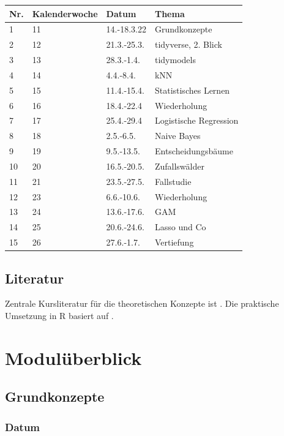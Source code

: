 \documentclass[
]{book}
\begin{document}
\begin{longtable}[]{@{}llll@{}}
\toprule
Nr. & Kalenderwoche & Datum & Thema \\
\midrule
\endhead
1 & 11 & 14.-18.3.22 & Grundkonzepte \\
2 & 12 & 21.3.-25.3. & tidyverse, 2. Blick \\
3 & 13 & 28.3.-1.4. & tidymodels \\
4 & 14 & 4.4.-8.4. & kNN \\
5 & 15 & 11.4.-15.4. & Statistisches Lernen \\
6 & 16 & 18.4.-22.4 & Wiederholung \\
7 & 17 & 25.4.-29.4 & Logistische Regression \\
8 & 18 & 2.5.-6.5. & Naive Bayes \\
9 & 19 & 9.5.-13.5. & Entscheidungsbäume \\
10 & 20 & 16.5.-20.5. & Zufallswälder \\
11 & 21 & 23.5.-27.5. & Fallstudie \\
12 & 23 & 6.6.-10.6. & Wiederholung \\
13 & 24 & 13.6.-17.6. & GAM \\
14 & 25 & 20.6.-24.6. & Lasso und Co \\
15 & 26 & 27.6.-1.7. & Vertiefung \\
\bottomrule
\end{longtable}

\hypertarget{literatur}{%
\section{Literatur}\label{literatur}}

Zentrale Kursliteratur für die theoretischen Konzepte ist \citep{rhys_machine_2020}.
Die praktische Umsetzung in R basiert auf \citep{silge_tidy_2022}.

\hypertarget{moduluxfcberblick}{%
\chapter{Modulüberblick}\label{moduluxfcberblick}}

\hypertarget{grundkonzepte}{%
\section{Grundkonzepte}\label{grundkonzepte}}

\hypertarget{datum}{%
\subsection{Datum}\label{datum}}
\end{document}
